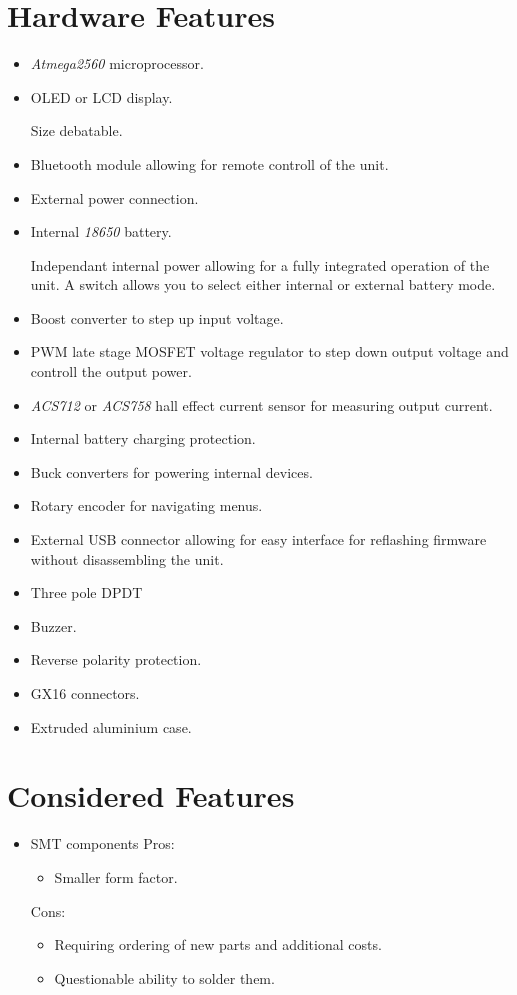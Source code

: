 \documentclass{article}
\begin{document}
\section{Hardware Features}
\begin{itemize}
	\item \textit{Atmega2560} microprocessor.
	\item OLED or LCD display.
	
	Size debatable.
	\item Bluetooth module allowing for remote controll of the unit.
	\item External power connection.
	\item Internal \textit{18650} battery.
	
	Independant internal power allowing for a fully integrated operation of the unit. A switch allows you to select either internal or external 	battery mode.
	\item Boost converter to step up input voltage.
	\item PWM late stage MOSFET voltage regulator to step down output voltage and controll the output power.
	\item \textit{ACS712} or \textit{ACS758} hall effect current sensor for measuring output current.
	\item Internal battery charging protection.
	\item Buck converters for powering internal devices.
	\item Rotary encoder for navigating menus.
	\item External USB connector allowing for easy interface for reflashing firmware without disassembling the unit.
	\item Three pole DPDT
	\item Buzzer.
	\item Reverse polarity protection.
	\item GX16 connectors.
	\item Extruded aluminium case.
\end{itemize}


\section{Considered Features}

\begin{itemize}
	\item SMT components
	Pros:
	\begin{itemize}
		\item Smaller form factor.
	\end{itemize}
	Cons:
	\begin{itemize}
		\item Requiring ordering of new parts and additional costs.
		\item Questionable ability to solder them.
	\end{itemize}
\end{itemize}
\end{document}
